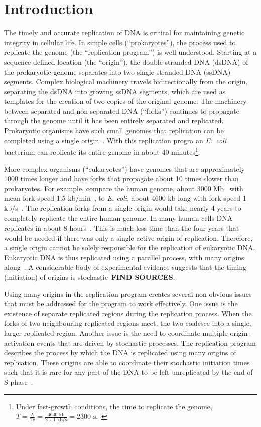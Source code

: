 \chapter{Introduction}
\label{ch:Introduction}

The timely and accurate replication of DNA is critical for maintaining genetic integrity in cellular life.
In simple cells (``prokaryotes''), the process used to replicate the genome (the ``replication program'') is well understood.
Starting at a sequence-defined location (the ``origin''), the double-stranded DNA (dsDNA) of the prokaryotic genome separates into two single-stranded DNA (ssDNA) segments.
Complex biological machinery travels bidirectionally from the origin, separating the dsDNA into growing ssDNA segments, which are used as templates for the creation of two copies of the original genome.
The machinery between separated and non-separated DNA (``forks'') continues to propagate through the genome until it has been entirely separated and replicated.
Prokaryotic organisms have such small genomes that replication can be completed using a single origin~\cite{MolecularCellBiology}.
With this replication progra an \emph{E.~coli} bacterium can replicate its entire genome in about 40 minutes\footnote{
Under fast-growth conditions, the time to replicate the genome, $T=\frac{L}{2v}=\frac{4600\text{ kb}}{2\times1\text{ kb/s}} = 2300\text{ s}$.~\cite{EColi}}.

More complex organisms (``eukaryotes'') have genomes that are approximately 1000 times longer and have forks that propagate about 10 times slower than prokaryotes.
For example, compare the human genome, about 3000 Mb~\cite{HumanGenomeLength} with mean fork speed 1.5 kb/min~\cite{HumanForks}, to \emph{E. coli}, about 4600 kb long with fork speed 1 kb/s~\cite{EColi}.
The replication forks from a single origin would take nearly 4 years to completely replicate the entire human genome.
In many human cells DNA replicates in about 8 hours~\cite{CellMolApproach}.
This is much less time than the four years that would be needed if there was only a single active origin of replication.
Therefore, a single origin cannot be solely responsible for the replication of eukaryotic DNA.
Eukaryotic DNA is thus replicated using a parallel process, with many origins along~\cite{eukaryotereview}.
A considerable body of experimental evidence suggests that the timing (initiation) of origins is stochastic~\cite{DNACombing,Stochastic}\textbf{FIND SOURCES}.

Using many origins in the replication program creates several non-obvious issues that must be addressed for the program to work effectively.
One issue is the existence of separate replicated regions during the replication process.
When the forks of two neighbouring replicated regions meet, the two coalesce into a single, larger replicated region.
Another issue is the need to coordinate multiple origin-activation events that are driven by stochastic processes.
The replication program describes the process by which the DNA is replicated using many origins of replication.
These origins are able to coordinate their stochastic initiation times such that it is rare for any part of the DNA to be left unreplicated by the end of S phase~\cite{eukaryotereview}.


